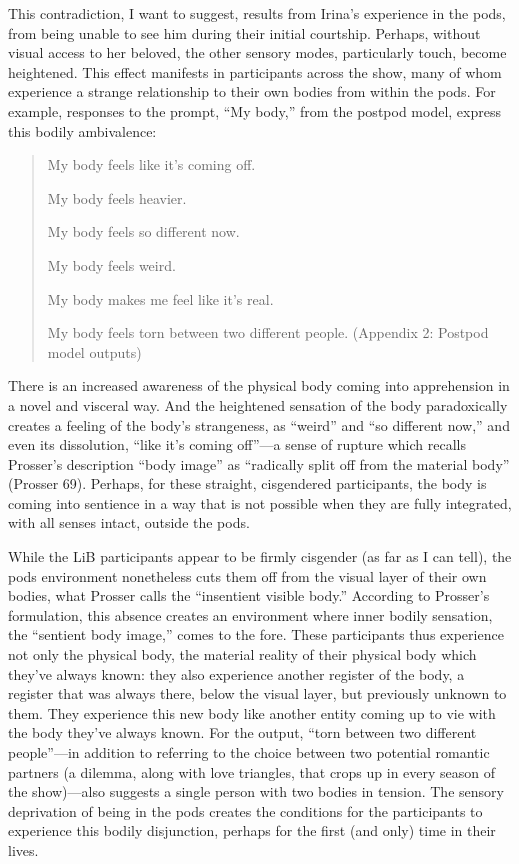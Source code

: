 \documentclass[11pt]{article}
\begin{document}
This contradiction, I want to suggest, results from Irina’s experience
in the pods, from being unable to see him during their initial
courtship. Perhaps, without visual access to her beloved, the other
sensory modes, particularly touch, become heightened. This effect
manifests in participants across the show, many of whom experience a
strange relationship to their own bodies from within the pods. For
example, responses to the prompt, “My body,” from the postpod model,
express this bodily ambivalence:

\begin{quote}
My body feels like it's coming off.

My body feels heavier.

My body feels so different now.

My body feels weird.

My body makes me feel like it's real.

My body feels torn between two different people. (Appendix 2: Postpod
model outputs)
\end{quote}

There is an increased awareness of the physical body coming into
apprehension in a novel and visceral way. And the heightened sensation
of the body paradoxically creates a feeling of the body’s strangeness,
as “weird” and “so different now,” and even its dissolution, “like
it’s coming off”—a sense of rupture which recalls Prosser’s
description “body image” as “radically split off from the material
body” (Prosser 69). Perhaps, for these straight, cisgendered
participants, the body is coming into sentience in a way that is not
possible when they are fully integrated, with all senses intact,
outside the pods.

While the LiB participants appear to be firmly cisgender (as far as I
can tell), the pods environment nonetheless cuts them off from the
visual layer of their own bodies, what Prosser calls the “insentient
visible body.” According to Prosser’s formulation, this absence
creates an environment where inner bodily sensation, the “sentient
body image,” comes to the fore. These participants thus experience not
only the physical body, the material reality of their physical body
which they’ve always known: they also experience another register of
the body, a register that was always there, below the visual layer,
but previously unknown to them. They experience this new body like
another entity coming up to vie with the body they’ve always known.
For the output, “torn between two different people”—in addition to
referring to the choice between two potential romantic partners (a
dilemma, along with love triangles, that crops up in every season of
the show)—also suggests a single person with two bodies in tension.
The sensory deprivation of being in the pods creates the conditions
for the participants to experience this bodily disjunction, perhaps
for the first (and only) time in their lives.
\end{document}
